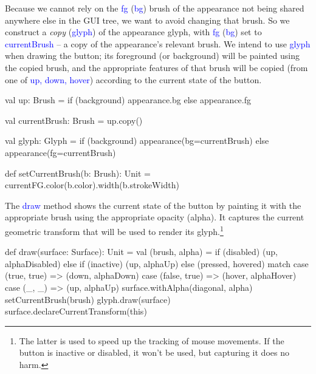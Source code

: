 \documentclass[12pt,a4paper]{article}
\def\Scala#1{\textcolor{blue}{\textsf{#1}}}
\begin{document}
\begin{scala}
class ColourButton(
  appearance:     Glyph,
  down:           Brush,
  hover:          Brush,
  val background: Boolean, 
  val react:      Reaction) extends GenericButton {
  
  override def toString: String =
           s"ColourButton($up, $down, $hover, $background)"
\end{scala}

Because we cannot rely on the \Scala{fg} (\Scala{bg}) brush of the appearance
not being shared anywhere else in the GUI tree, we want to avoid
changing that brush. So we construct a \textit{copy} (\Scala{glyph})
of the appearance glyph, with \Scala{fg} (\Scala{bg}) set to \Scala{currentBrush}
-- a copy of the appearance's relevant brush. We intend to use
\Scala{glyph} when drawing the button; its  foreground (or background)  will
be painted using the copied brush, and the appropriate features of
that brush will be copied (from one of \Scala{up, down, hover})
according to the current state of the button.

\begin{scala}
   val up: Brush =
       if (background) appearance.bg else appearance.fg

   val currentBrush: Brush = up.copy()

   val glyph: Glyph        =
       if (background)
          appearance(bg=currentBrush)
       else
          appearance(fg=currentBrush)

   def setCurrentBrush(b: Brush): Unit = {
      currentFG.color(b.color).width(b.strokeWidth)
    }
\end{scala}

The \Scala{draw} method shows the current state of the
button by painting it with the appropriate brush using
the appropriate opacity (alpha).
It captures the current geometric transform that
will be used to render its glyph.\footnote{ The latter is used to
speed up the tracking of mouse movements. If the button is inactive or disabled,
it won't be used, but capturing it does no harm.}

\begin{scala}
    def draw(surface: Surface): Unit = {
        val (brush, alpha) = 
            if (disabled) (up, alphaDisabled) else
            if (inactive) (up, alphaUp) else
            (pressed, hovered) match {
              case (true, true)  => (down,  alphaDown)
              case (false, true) => (hover, alphaHover)
              case (_, _)        => (up,    alphaUp)
            }
        surface.withAlpha(diagonal, alpha) {
          setCurrentBrush(brush)
          glyph.draw(surface)
          surface.declareCurrentTransform(this)
       }
   }
\end{scala}
\end{document}

